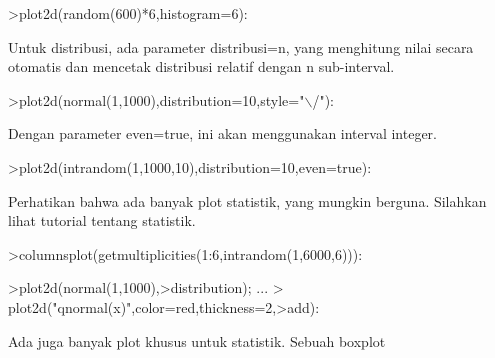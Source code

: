 \documentclass{article}
\begin{document}
\begin{eulernotebook}
\begin{eulercomment}
\begin{eulercomment}
\begin{eulercomment}
\begin{eulercomment}
\begin{eulercomment}
\begin{eulercomment}
\begin{eulercomment}
\begin{eulercomment}
\begin{eulercomment}
\begin{eulercomment}
\begin{eulercomment}
\begin{eulercomment}
\begin{eulercomment}
\begin{eulercomment}
\begin{eulercomment}
\begin{eulercomment}
\begin{eulercomment}
\begin{eulercomment}
\begin{eulercomment}
\begin{eulercomment}
\begin{eulercomment}
\begin{eulercomment}
\begin{eulercomment}
\begin{eulercomment}
\begin{eulercomment}
\begin{eulercomment}
\begin{eulerprompt}
>plot2d(random(600)*6,histogram=6):
\end{eulerprompt}
\begin{eulercomment}
Untuk distribusi, ada parameter distribusi=n, yang menghitung nilai
secara otomatis dan mencetak distribusi relatif dengan n sub-interval.
\end{eulercomment}
\begin{eulerprompt}
>plot2d(normal(1,1000),distribution=10,style="\(\backslash\)/"):
\end{eulerprompt}
\begin{eulercomment}
Dengan parameter even=true, ini akan menggunakan interval integer.
\end{eulercomment}
\begin{eulerprompt}
>plot2d(intrandom(1,1000,10),distribution=10,even=true):
\end{eulerprompt}
\begin{eulercomment}
Perhatikan bahwa ada banyak plot statistik, yang mungkin berguna.
Silahkan lihat tutorial tentang statistik.
\end{eulercomment}
\begin{eulerprompt}
>columnsplot(getmultiplicities(1:6,intrandom(1,6000,6))):
\end{eulerprompt}
\begin{eulerprompt}
>plot2d(normal(1,1000),>distribution); ...
>  plot2d("qnormal(x)",color=red,thickness=2,>add):
\end{eulerprompt}
\begin{eulercomment}
Ada juga banyak plot khusus untuk statistik. Sebuah boxplot

\end{eulercomment}
\end{eulercomment}
\end{eulercomment}
\end{eulercomment}
\end{eulercomment}
\end{eulercomment}
\end{eulercomment}
\end{eulercomment}
\end{eulercomment}
\end{eulercomment}
\end{eulercomment}
\end{eulercomment}
\end{eulercomment}
\end{eulercomment}
\end{eulercomment}
\end{eulercomment}
\end{eulercomment}
\end{eulercomment}
\end{eulercomment}
\end{eulercomment}
\end{eulercomment}
\end{eulercomment}
\end{eulercomment}
\end{eulercomment}
\end{eulercomment}
\end{eulercomment}
\end{eulercomment}
\end{eulernotebook}
\end{document}
